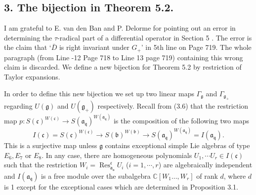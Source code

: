 \documentclass[a4paper]{amsart}
\theoremstyle{plain}
\theoremstyle{definition}
\def\Res{\operatorname{Res}}
\newcommand{\fra}{\mathfrak{a}}
\newcommand{\frb}{\mathfrak{b}}
\newcommand{\frc}{\mathfrak{c}}
\newcommand{\frg}{\mathfrak{g}}
\newcommand{\frq}{\mathfrak{q}}
\newcommand{\bbC}{\mathbb{C}}
\begin{document}
\subsection*{3. The bijection in Theorem 5.2.}



I am grateful to E. van den Ban and P. Delorme for pointing out an error in determining the
$\tau$-radical part of a differential operator in Section 5 \cite{H}.  The error is
the claim that `$\bar D$ is right invariant under $G_+$' in 5th line on Page 719.
The whole paragraph
(from Line -12 Page 718 to Line 13 page 719) containing this wrong claim is discarded.
We define a new bijection for Theorem 5.2 by restriction of Taylor expansions.

In order to define this new bijection we set up two linear maps $\Gamma_\frg$ and $\Gamma_{\frg_+}$ regarding $U(\frg)$ and $U(\frg_+)$ respectively.
Recall from (3.6) that the restriction map
$p\colon S(\frc)^{W(\frc)}\rightarrow S(\fra_{\frq})^{W(\fra_\frq)}$ is the
composition of the following two maps
$$ I(\frc)=S(\frc)^{W(\frc)}\rightarrow S(\frb)^{W(\frb)}\rightarrow S(\fra_{\frq})^{W(\fra_\frq)}=I(\fra_\frq).$$
This is a surjective map unless $\frg$ contains exceptional simple Lie algebras of type $E_6, E_7$ or $E_8$.
In any case, there are homogeneous polynomials $U_1, \cdots U_r\in I(\frc)$ such that the restriction
$W_i=\Res^\frc_{\fra_\fra}U_i$ ($i=1, \cdots, r$) are algebraically independent and
$I(\fra_\frq)$ is a free module over the subalgebra $\bbC[W_1\ldots, W_r]$ of rank $d$,
where $d$ is 1 except for the exceptional cases which are determined in Proposition 3.1.
\end{document}
